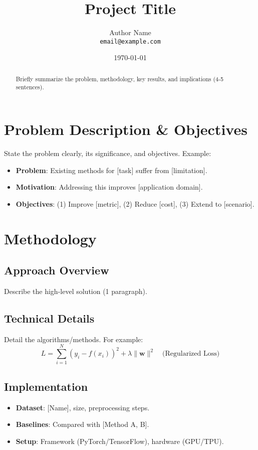 \documentclass[12pt]{article}
\title{Project Title}
\author{Author Name \\ \texttt{email@example.com}}
\date{\today}
\begin{document}
\maketitle

\begin{abstract}
    Briefly summarize the problem, methodology, key results, and implications (4-5 sentences). 
\end{abstract}

\section{Problem Description \& Objectives}
\label{sec:problem}
State the problem clearly, its significance, and objectives. Example:
\begin{itemize}
    \item \textbf{Problem}: Existing methods for [task] suffer from [limitation]. 
    \item \textbf{Motivation}: Addressing this improves [application domain]. 
    \item \textbf{Objectives}: (1) Improve [metric], (2) Reduce [cost], (3) Extend to [scenario].
\end{itemize}

\section{Methodology}
\label{sec:method}
\subsection{Approach Overview}
Describe the high-level solution (1 paragraph). 

\subsection{Technical Details}
Detail the algorithms/methods. For example:
\begin{equation}
    L = \sum_{i=1}^N (y_i - f(x_i))^2 + \lambda \|\mathbf{w}\|^2 \quad \text{(Regularized Loss)}
\end{equation}

\subsection{Implementation}
\begin{itemize}
    \item \textbf{Dataset}: [Name], size, preprocessing steps.
    \item \textbf{Baselines}: Compared with [Method A, B].
    \item \textbf{Setup}: Framework (PyTorch/TensorFlow), hardware (GPU/TPU).
\end{itemize}
\end{document}
